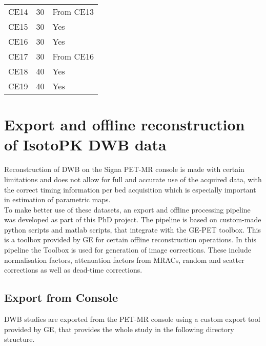 \begin{table}[]
\begin{tabular}{|l|l|l|}
CE14                & 30                                             & From CE13     \\
CE15                & 30                                             & Yes  \\
CE16                & 30                                             & Yes  \\
CE17                & 30                                             & From CE16     \\
CE18                & 40                                             & Yes  \\
CE19                & 40                                             & Yes  \\
\bottomrule
\end{tabular}
\end{table}


\section{Export and offline reconstruction of IsotoPK DWB data}
Reconstruction of DWB on the Signa PET-MR console is made with certain limitations and does not allow for full and accurate use of the acquired data, with the correct timing information per bed acquisition which is especially important in estimation of parametric maps. \\
To make better use of these datasets, an export and offline processing pipeline was developed as part of this PhD project. The pipeline is based on custom-made python scripts and matlab scripts, that integrate with the GE-PET toolbox. This is a toolbox provided by GE for certain offline reconstruction operations. In this pipeline the Toolbox is used for generation of image corrections. These include normalisation factors, attenuation factors from MRACs, random and scatter corrections as well as dead-time corrections. 

\subsection{Export from Console}
DWB studies are exported from the PET-MR console using a custom export tool provided by GE, that provides the whole study in the following directory structure.  \\

